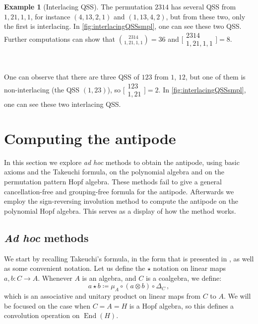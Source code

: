 \documentclass[12pt, reqno]{amsart}
\theoremstyle{definition}
\newtheorem{smpl}[thm]{Example}
\DeclareMathOperator{\End}{\mathrm{End}}
\begin{document}
\begin{smpl}[Interlacing QSS]
The permutation $2314$ has several QSS from $1, 21, 1, 1$, for instance $(4, 13, 2, 1)$ and $(1, 13, 4, 2)$, but from these two, only the first is interlacing.
In \cref{fig:interlacingQSSsmpl}, one can see these two QSS.
Further computations can show that $\binom{2314}{1, 21, 1, 1} = 36$ and $\bigl[\!\begin{smallmatrix} 2314 \\ 1, 21, 1, 1 \end{smallmatrix}\!\bigr] = 8$.

\

One can observe that there are three QSS of $123$ from $1$, $12$, but one of them is non-interlacing (the QSS $(1,23)$), so
$\bigl[\!\begin{smallmatrix} 123 \\ 1, 21 \end{smallmatrix}\!\bigr] = 2$.
In \cref{fig:interlacingQSSsmpl}, one can see these two interlacing QSS.
\end{smpl}


\section{Computing the antipode\label{sec:antipode_computing}}

In this section we explore \textit{ad hoc} methods to obtain the antipode, using basic axioms and the Takeuchi formula, on the polynomial algebra and on the permutation pattern Hopf algebra.
These methods fail to give a general cancellation-free and grouping-free formula for the antipode.
Afterwards we employ the sign-reversing involution method to compute the antipode on the polynomial Hopf algebra.
This serves as a display of how the method works.

\subsection{\textit{Ad hoc} methods}
We start by recalling Takeuchi's formula, in the form that is presented in \cite{GrinbergReiner}, as well as some convenient notation.
Let us define the $\star$ notation on linear maps $a, b: C \to A$.
Whenever $A$ is an algebra, and $C$ is a coalgebra, we define:
$$a \star b \coloneqq \mu_A \circ (a \otimes b) \circ \Delta_C\, ,$$
which is an associative and unitary product on linear maps from $C$ to $A$. We will be focused on the case when $C=A=H$ is a Hopf algebra, so this defines a convolution operation on $\End(H)$.
\end{document}
